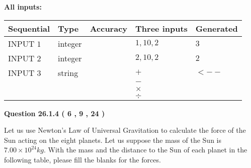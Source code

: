 \documentclass[12pt]{article}
\begin{document}
   
\noindent\vspace{0.1in}\hspace{-0.08in} {\textbf{\Large{All inputs: }}}
   
   
  
  
\noindent\begin{tabular}{|l|l|l|l|l|}
\hline
 Sequential & Type & Accuracy & Three inputs & Generated \\ 
\hline
 
 
  INPUT $            1 $ & integer &  & $
 1
 , 
 10
 , 
 2
 $ & $ 3 $ 
 \\  \hline  
 
 
  INPUT $            2 $ & integer &  & $
 2
 , 
 10
 , 
 2
 $ & $ 2 $ 
 \\  \hline  
 
 
  INPUT $            3 $ & string & & 
 $+$ & 
  $ <-- $ 
  \\
  & & & 
 $-$ & 
  \\
  & & & 
 $\times$ & 
  \\
  & & & 
 $\div$ & 
 \\  \hline  
 \end{tabular}
   
   
  
\vspace{0.2in}
  
{\textbf{\Large{Question
26.1.4 
 (           6 ,           9 ,          24 )
}}}
  
  
Let us use Newton's Law of Universal Gravitation to calculate the force
of the Sun acting on the eight planets. Let us suppose the mass of the
Sun is $ %
7.00 \times 10^{24} kg$. With the mass and the
distance to the Sun of each planet in the following table, please fill
the blanks for the forces.
 
\vspace{0.2in}
 
\end{document}
